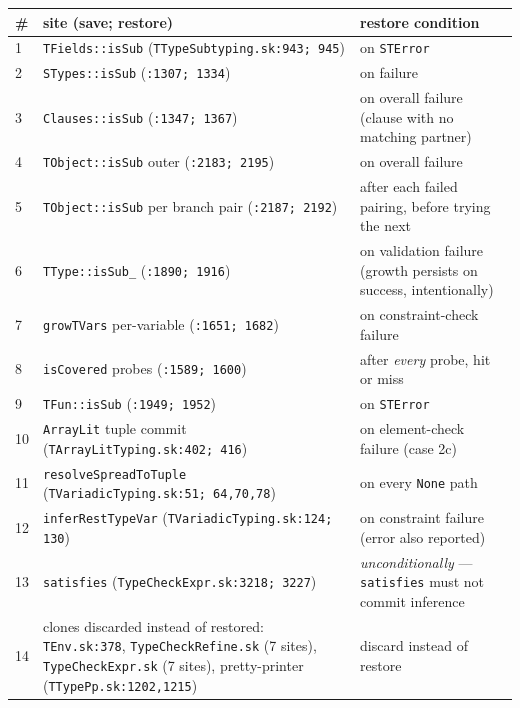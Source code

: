 \documentclass[11pt]{article}
\begin{document}
\begin{center}
\renewcommand{\arraystretch}{1.15}
\small
\begin{tabular}{@{}p{0.5cm}>{\raggedright\arraybackslash}p{7.4cm}>{\raggedright\arraybackslash}p{5.4cm}@{}}
\toprule
\# & site (save; restore) & restore condition \\
\midrule
1 & \texttt{TFields::isSub} (\texttt{TTypeSubtyping.sk:943; 945}) &
  on \texttt{STError} \\
2 & \texttt{STypes::isSub} (\texttt{:1307; 1334}) & on failure \\
3 & \texttt{Clauses::isSub} (\texttt{:1347; 1367}) &
  on overall failure (clause with no matching partner) \\
4 & \texttt{TObject::isSub} outer (\texttt{:2183; 2195}) &
  on overall failure \\
5 & \texttt{TObject::isSub} per branch pair (\texttt{:2187; 2192}) &
  after each failed pairing, before trying the next \\
6 & \texttt{TType::isSub\_} (\texttt{:1890; 1916}) &
  on validation failure (growth persists on success, intentionally) \\
7 & \texttt{growTVars} per-variable (\texttt{:1651; 1682}) &
  on constraint-check failure \\
8 & \texttt{isCovered} probes (\texttt{:1589; 1600}) &
  after \emph{every} probe, hit or miss \\
9 & \texttt{TFun::isSub} (\texttt{:1949; 1952}) & on \texttt{STError} \\
10 & \texttt{ArrayLit} tuple commit (\texttt{TArrayLitTyping.sk:402;
  416}) & on element-check failure (case 2c) \\
11 & \texttt{resolveSpreadToTuple} (\texttt{TVariadicTyping.sk:51;
  64,70,78}) & on every \texttt{None} path \\
12 & \texttt{inferRestTypeVar} (\texttt{TVariadicTyping.sk:124; 130}) &
  on constraint failure (error also reported) \\
13 & \texttt{satisfies} (\texttt{TypeCheckExpr.sk:3218; 3227}) &
  \emph{unconditionally} — \texttt{satisfies} must not commit inference \\
14 & clones discarded instead of restored: \texttt{TEnv.sk:378},
  \texttt{TypeCheckRefine.sk} (7 sites), \texttt{TypeCheckExpr.sk}
  (7 sites), pretty-printer (\texttt{TTypePp.sk:1202,1215}) &
  discard instead of restore \\
\bottomrule
\end{tabular}
\end{center}
\end{document}
